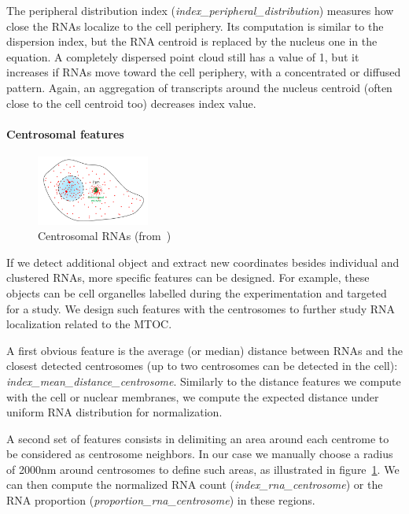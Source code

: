 The peripheral distribution index (\emph{index\_peripheral\_distribution}) measures how close the \ac{RNA}s localize to the cell periphery.
Its computation is similar to the dispersion index, but the \ac{RNA} centroid is replaced by the nucleus one in the equation.
A completely dispersed point cloud still has a value of 1, but it increases if \ac{RNA}s move toward the cell periphery, with a concentrated or diffused pattern.
Again, an aggregation of transcripts around the nucleus centroid (often close to the cell centroid too) decreases index value.

\paragraph{Centrosomal features}

\begin{figure}
	\begin{center}
	\includegraphics[width=0.33\textwidth]{figures/chapter4/centrosomal_features}
	\caption{Centrosomal \ac{RNA}s (from~\cite{safieddine_choreography_2021})}
	\label{fig:centrosome_features}
	\end{center}
\end{figure}

If we detect additional object and extract new coordinates besides individual and clustered \ac{RNA}s, more specific features can be designed.
For example, these objects can be cell organelles labelled during the experimentation and targeted for a study.
We design such features with the centrosomes to further study \ac{RNA} localization related to the \ac{MTOC}.

A first obvious feature is the average (or median) distance between \ac{RNA}s and the closest detected centrosomes (up to two centrosomes can be detected in the cell): \emph{index\_mean\_distance\_centrosome}.
Similarly to the distance features we compute with the cell or nuclear membranes, we compute the expected distance under uniform \ac{RNA} distribution for normalization.

A second set of features consists in delimiting an area around each centrome to be considered as centrosome neighbors.
In our case we manually choose a radius of 2000nm around centrosomes to define such areas, as illustrated in figure~\ref{fig:centrosome_features}.
We can then compute the normalized \ac{RNA} count (\emph{index\_rna\_centrosome}) or the \ac{RNA} proportion (\emph{proportion\_rna\_centrosome}) in these regions.


